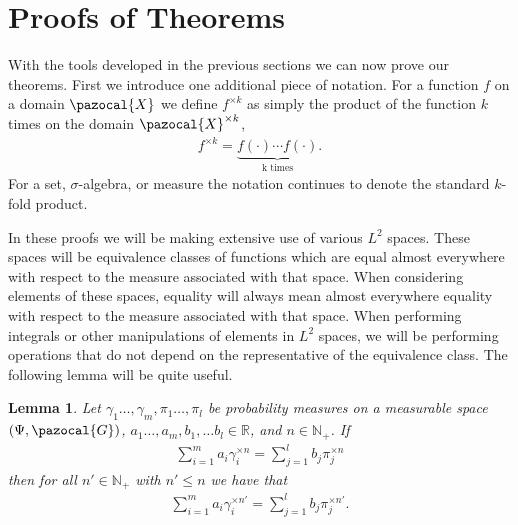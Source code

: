 \documentclass[aos,preprint]{imsart}
\def\rn{\mathbb{R}}
\def\sG{\pazocal{G}}
\def\sX{\pazocal{X}}
\theoremstyle{plain}
\newtheorem{lem}{Lemma}[section]
\theoremstyle{defintion}
\begin{document}
	\section{Proofs of Theorems}\label{sec:proofsoftheorems}
	With the tools developed in the previous sections we can now prove our theorems. First we introduce one additional piece of notation. For a function $f$ on a domain $\sX$ we define $f^{\times k}$ as simply the product of the function $k$ times on the domain $\sX^{\times k}$, 
        \begin{align*}
            f^{\times k} = \underbrace{f(\cdot)\cdots f(\cdot)}_{\text{k times}}.
        \end{align*}
        For a set, $\sigma$-algebra, or measure the notation continues to denote the standard $k$-fold product.

	In these proofs we will be making extensive use of various $L^2$ spaces. These spaces will be equivalence classes of functions which are equal almost everywhere with respect to the measure associated with that space. When considering elements of these spaces, equality will always mean almost everywhere equality with respect to the measure associated with that space. When performing integrals or other manipulations of elements in $L^2$ spaces, we will be performing operations that do not depend on the representative of the equivalence class.
	The following lemma will be quite useful.
	\begin{lem}\label{lem:noidentdown}
		Let $\gamma_1\ldots,\gamma_m, \pi_1\ldots,\pi_l$ be probability measures on a measurable space $\left( \Psi,\sG \right)$, $a_1\ldots,a_m,b_1,\ldots b_l \in \rn$, and $n\in \mathbb{N}_+$. If
		\begin{eqnarray*}
			\sum_{i=1}^m a_i \gamma_i^{\times n} =  \sum_{j=1}^l b_j \pi_j^{\times n}
		\end{eqnarray*}
		then for all $n'\in \mathbb{N}_+$ with $n'\le n$ we have that
		\begin{eqnarray*}
			\sum_{i=1}^m a_i \gamma_i^{\times n'} =  \sum_{j=1}^l b_j \pi_j^{\times n'}.
		\end{eqnarray*}
	\end{lem}
\end{document}
